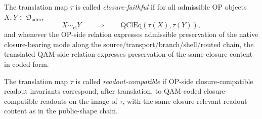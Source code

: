 \begin{definition}
The translation map $\tau$ is called \emph{closure-faithful} if for all admissible OP objects $X,Y\in\mathfrak{O}_{\mathrm{adm}}$,
\[
X \sim_{\mathrm{cl}} Y
\qquad\Longrightarrow\qquad
\mathrm{QClEq}(\tau(X),\tau(Y)),
\]
and whenever the OP-side relation expresses admissible preservation of the native closure-bearing mode along the source/transport/branch/shell/routed chain, the translated QAM-side relation expresses preservation of the same closure content in coded form.
\end{definition}

\begin{definition}
The translation map $\tau$ is called \emph{readout-compatible} if OP-side closure-compatible readout invariants correspond, after translation, to QAM-coded closure-compatible readouts on the image of $\tau$, with the same closure-relevant readout content as in the public-shape chain.
\end{definition}


